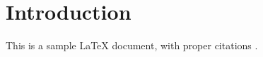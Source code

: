 \section{Introduction}
This is a sample LaTeX document, with proper citations \cite{jones2020,brown2019}.